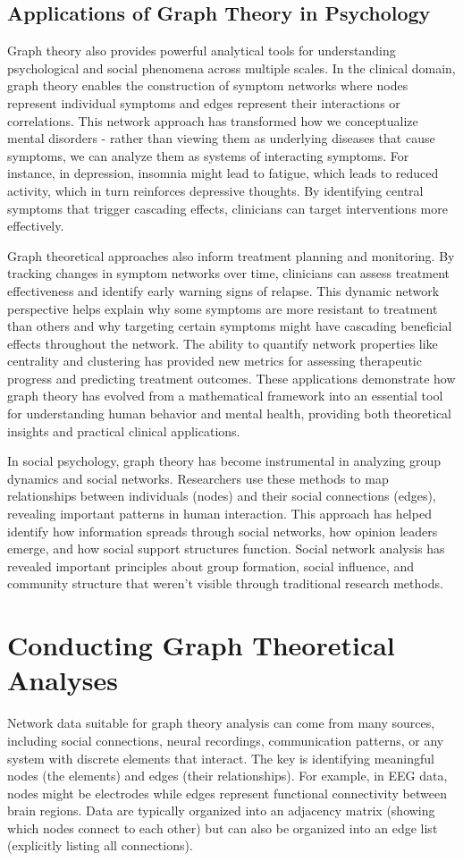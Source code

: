 \subsection*{Applications of Graph Theory in Psychology}
Graph theory also provides powerful analytical tools for understanding psychological and social phenomena across multiple scales. In the clinical domain, graph theory enables the construction of symptom networks where nodes represent individual symptoms and edges represent their interactions or correlations. This network approach has transformed how we conceptualize mental disorders - rather than viewing them as underlying diseases that cause symptoms, we can analyze them as systems of interacting symptoms. For instance, in depression, insomnia might lead to fatigue, which leads to reduced activity, which in turn reinforces depressive thoughts. By identifying central symptoms that trigger cascading effects, clinicians can target interventions more effectively.

Graph theoretical approaches also inform treatment planning and monitoring. By tracking changes in symptom networks over time, clinicians can assess treatment effectiveness and identify early warning signs of relapse. This dynamic network perspective helps explain why some symptoms are more resistant to treatment than others and why targeting certain symptoms might have cascading beneficial effects throughout the network. The ability to quantify network properties like centrality and clustering has provided new metrics for assessing therapeutic progress and predicting treatment outcomes.
These applications demonstrate how graph theory has evolved from a mathematical framework into an essential tool for understanding human behavior and mental health, providing both theoretical insights and practical clinical applications.

In social psychology, graph theory has become instrumental in analyzing group dynamics and social networks. Researchers use these methods to map relationships between individuals (nodes) and their social connections (edges), revealing important patterns in human interaction. This approach has helped identify how information spreads through social networks, how opinion leaders emerge, and how social support structures function. Social network analysis has revealed important principles about group formation, social influence, and community structure that weren't visible through traditional research methods.

\section{Conducting Graph Theoretical Analyses}
Network data suitable for graph theory analysis can come from many sources, including social connections, neural recordings, communication patterns, or any system with discrete elements that interact. The key is identifying meaningful nodes (the elements) and edges (their relationships). For example, in EEG data, nodes might be electrodes while edges represent functional connectivity between brain regions. Data are typically organized into an adjacency matrix (showing which nodes connect to each other) but can also be organized into an edge list (explicitly listing all connections).

